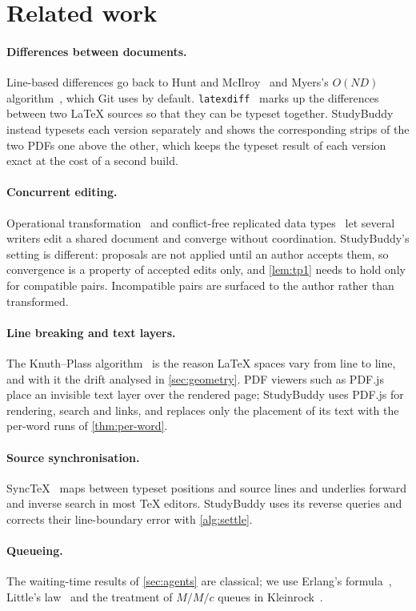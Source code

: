 \section{Related work}
\label{sec:related}

\paragraph{Differences between documents.}
Line-based differences go back to Hunt and McIlroy~\cite{hunt1976} and Myers's
$O(ND)$ algorithm~\cite{myers1986}, which Git uses by default.
\texttt{latexdiff}~\cite{latexdiff} marks up the differences between two
\LaTeX{} sources so that they can be typeset together. StudyBuddy instead
typesets each version separately and shows the corresponding strips of the
two PDFs one above the other, which keeps the typeset result of each version
exact at the cost of a second build.

\paragraph{Concurrent editing.}
Operational transformation~\cite{ellis1989} and conflict-free replicated data
types~\cite{shapiro2011} let several writers edit a shared document and converge
without coordination. StudyBuddy's setting is different: proposals are not applied
until an author accepts them, so convergence is a property of accepted edits
only, and \cref{lem:tp1} needs to hold only for compatible pairs. Incompatible
pairs are surfaced to the author rather than transformed.

\paragraph{Line breaking and text layers.}
The Knuth--Plass algorithm~\cite{knuth1981} is the reason \LaTeX{} spaces vary
from line to line, and with it the drift analysed in \cref{sec:geometry}. PDF
viewers such as PDF.js~\cite{pdfjs} place an invisible text layer over the
rendered page; StudyBuddy uses PDF.js for rendering, search and links, and
replaces only the placement of its text with the per-word runs of
\cref{thm:per-word}.

\paragraph{Source synchronisation.}
SyncTeX~\cite{laurens2008} maps between typeset positions and source lines and
underlies forward and inverse search in most \TeX{} editors. StudyBuddy uses its
reverse queries and corrects their line-boundary error with
\cref{alg:settle}.

\paragraph{Queueing.}
The waiting-time results of \cref{sec:agents} are classical; we use Erlang's
formula~\cite{erlang1917}, Little's law~\cite{little1961} and the treatment of
$M/M/c$ queues in Kleinrock~\cite{kleinrock1975}.
